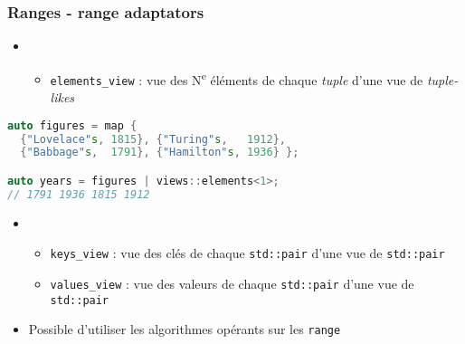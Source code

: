 \documentclass[C++.tex]{subfiles}
\begin{document}
\begin{frame}[fragile]
	\frametitle{Ranges - range adaptators}
	\begin{itemize}
		\item  [] \begin{itemize}
			\item \lstinline|elements_view| : vue des N\textsuperscript{e} éléments de chaque \textit{tuple} d'une vue de \textit{tuple-likes}
		\end{itemize}
	\end{itemize}

	\begin{lstlisting}[language=C++]
auto figures = map {
  {"Lovelace"s, 1815}, {"Turing"s,   1912},
  {"Babbage"s,  1791}, {"Hamilton"s, 1936} };

auto years = figures | views::elements<1>;
// 1791 1936 1815 1912\end{lstlisting}

	\begin{itemize}
		\item  [] \begin{itemize}
			\item \lstinline|keys_view| : vue des clés de chaque \lstinline|std::pair| d'une vue de \lstinline|std::pair|
			\item \lstinline|values_view| : vue des valeurs de chaque \lstinline|std::pair| d'une vue de \lstinline|std::pair|
		\end{itemize}
	\item Possible d'utiliser les algorithmes opérants sur les \lstinline|range|
	\end{itemize}
\end{frame}
\end{document}
